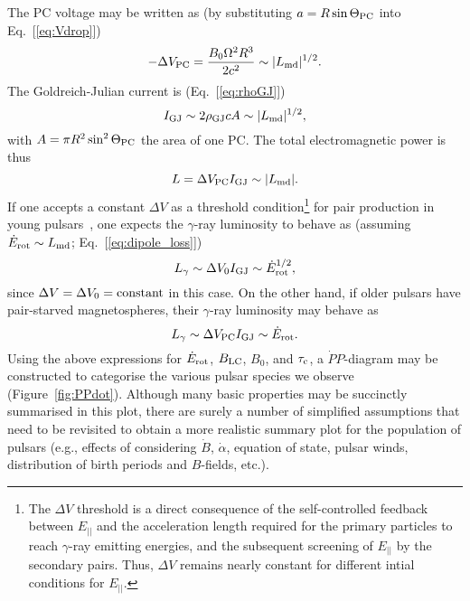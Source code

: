 \documentclass{PoS}
\newcommand{\beq}{\begin{equation}}
\newcommand{\eeq}{\end{equation}}
\begin{document}
The PC voltage may be written as (by substituting $a=R\sin\Theta_{\rm PC}$ into Eq.~[\ref{eq:Vdrop}])
\beq
-\Delta V_{\rm PC} = \frac{B_0\Omega^2R^3}{2c^2} \sim|L_{\rm md}|^{1/2}.
\eeq
The Goldreich-Julian current is (Eq.~[\ref{eq:rhoGJ}])
\beq
I_{\rm GJ}\sim2\rho_{\rm GJ}cA\sim|L_{\rm md}|^{1/2},
\eeq
with $A=\pi R^2\sin^2\Theta_{\rm PC}$ the area of one PC.
The total electromagnetic power is thus
\beq
L=\Delta V_{\rm PC}I_{\rm GJ}\sim|L_{\rm md}|.
\eeq
If one accepts a constant $\Delta V$ as a threshold condition\footnote{The $\Delta V$ threshold is a direct consequence of the self-controlled feedback between $E_{||}$ and the acceleration length required for the primary particles to reach $\gamma$-ray emitting energies, and the subsequent screening of $E_{||}$ by the secondary pairs. Thus, $\Delta V$ remains nearly constant for different intial conditions for $E_{||}$.} for pair production in young pulsars~\cite{Harding81}, one expects the $\gamma$-ray luminosity to behave as (assuming $\dot{E}_{\rm rot}\sim L_{\rm md}$; Eq.~[\ref{eq:dipole_loss}]) 
\beq
L_\gamma\sim \Delta V_0I_{\rm GJ}\sim\dot{E}_{\rm rot}^{1/2},
\eeq
since $\Delta V = \Delta V_0 = {\rm constant}$ in this case. On the other hand, if older pulsars have pair-starved magnetospheres, their $\gamma$-ray luminosity may behave as
\beq
L_\gamma\sim \Delta V_{\rm PC}I_{\rm GJ}\sim\dot{E}_{\rm rot}.
\eeq
Using the above expressions for $\dot{E}_{\rm rot}$, $B_{\rm LC}$, $B_0$, and $\tau_{\rm c}$, a $\dot{P}P$-diagram may be constructed to categorise the various pulsar species we observe (Figure~\ref{fig:PPdot}). Although many basic properties may be succinctly summarised in this plot, there are surely a number of simplified assumptions that need to be revisited to obtain a more realistic summary plot for the population of pulsars (e.g., effects of considering $\dot{B}$, $\dot{\alpha}$, equation of state, pulsar winds, distribution of birth periods and $B$-fields, etc.).
\end{document}
